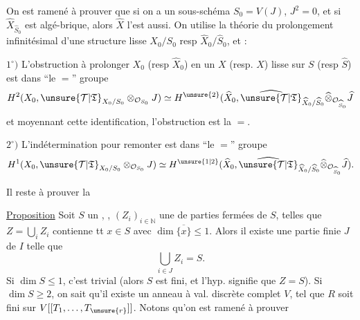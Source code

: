 On est ramené à prouver que si  on a un sous-schéma $S_0=V(J)$, $J^2=0$, et si $\widehat X_{\widehat S_0}$ est algé-brique, alors $\widehat X$ l'est aussi. On utilise la théorie du prolongement infinitésimal d'une structure lisse $X_0/S_0$ resp $\widehat X_0/\widehat S_0$, et :

$1^\circ)$ L'obstruction à prolonger $X_0$ (resp $\widehat X_0$) en un $X$ (resp. $\widehat X$) lisse sur $S$ (resp $\widehat S$) est dans ``le $=$'' groupe
\[
H^2(X_0,\unsure{\mathcal T|\mathfrak T}_{X_0/S_0}\otimes_{\mathcal O_{S_0}}J)\simeq H^{\unsure{2}}(\widehat X_0,\widehat{\unsure{\mathcal T|\mathfrak T}}_{\widehat X_0/\widehat S_0}\widehat\otimes_{\mathcal O_{\widehat S_0}}\widehat J
\]
et moyennant cette identification, l'obstruction est la $=$.

$2^\circ)$ L'indétermination pour remonter est dans ``le $=$'' groupe
\[
H^1(X_0,\unsure{\mathcal T|\mathfrak T}_{X_0/S_0}\otimes_{\mathcal O_{S_0}}J)\simeq H^{\unsure{1|2}}(\widehat X_0,\widehat{\unsure{\mathcal T|\mathfrak T}}_{\widehat X_0/\widehat S_0}\widehat\otimes_{\mathcal O_{\widehat S_0}}\widehat J).
\]

Il reste à prouver la

\uline{Proposition} Soit $S$ un  , , $(Z_i)_{i\in\mathbb N}$ une   de parties fermées  de $S$, telles que $Z=\bigcup_i Z_i$ contienne tt $x\in S$ avec $\dim\overline{\{x\}}\leq1$. Alors il existe une partie finie $J$ de $I$ telle que
\[
\bigcup_{i\in J}Z_i=S.
\]
Si $\dim S\leq1$, c'est trivial (alors  $S$ est fini, et l'hyp. signifie que $Z=S$). Si $\dim S\geq2$, on sait qu'il existe un anneau à val. discrète complet $V$,   tel que $R$ soit fini sur $V[[T_1,\ldots,T_{\unsure{r}}]]$. Notons qu'on est ramené  à prouver


